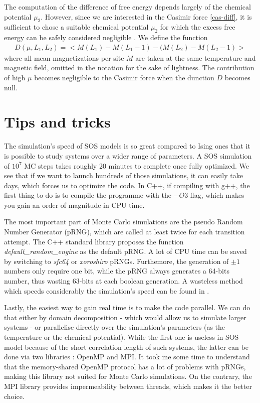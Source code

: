 {\color{red}
The computation of the difference of free energy depends largely of the chemical potential $\mu_2$. However, since we are interested in the Casimir force \eqref{cas-diff}, it is sufficient to chose a suitable chemical potential $\mu_2$ for which the excess free energy can be safely considered negligible \cite{lopes_cardozo_critical_2014} . We define the function
\begin{align}
    D(\mu,L_1,L_2) =  < M(L_1)-M(L_1-1) - (M(L_2)-M(L_2-1) >
    \label{function-d}
\end{align}
where all mean magnetizations per site $M$ are taken at the same temperature and magnetic field, omitted in the notation for the sake of lightness. The contribution of high $\mu$ becomes negligible to the Casimir force when the dunction $D$ becomes null.
}

\section{Tips and tricks}

The simulation's speed of SOS models is so great compared to Ising ones that it is possible to study systems over a wider range of parameters. A SOS simulation of $10^7$ MC steps takes roughly 20 minutes to complete once fully optimized. We see that if we want to launch hundreds of those simulations, it can easily take days, which forces us to optimize the code.
In C++, if compiling with g++, the first thing to do is to compile the programme with the $-O3$ flag, which makes you gain an order of magnitude in CPU time.

The most important part of Monte Carlo simulations are the pseudo Random Number Generator (pRNG), which are called at least twice for each transition attempt. The C++ standard library proposes the function \textit{default\_random\_engine} as the default pRNG. A lot of CPU time can be saved by switching to \textit{sfc64} or \textit{xoroshiro} pRNGs. Furthemore, the generation of $\pm1$ numbers only require one bit, while the pRNG always generates a 64-bits number, thus wasting 63-bits at each boolean generation. A wasteless method which speeds considerably the simulation's speed can be found in \cite{martin_ankerl_fast_nodate}.

Lastly, the easiest way to gain real time is to make the code parallel. We can do that either by domain decomposition - which would allow us to simulate larger systems - or parallelise directly over the simulation's parameters (as the temperature or the chemical potential). While the first one is useless in SOS model because of the short correlation length of such systems, the latter can be done via two libraries : OpenMP and MPI. It took me some time to understand that the memory-shared OpenMP protocol has a lot of problems with pRNGs, making this library not suited for Monte Carlo simulations. On the contrary, the MPI library provides impermeability between threads, which makes it the better choice.

